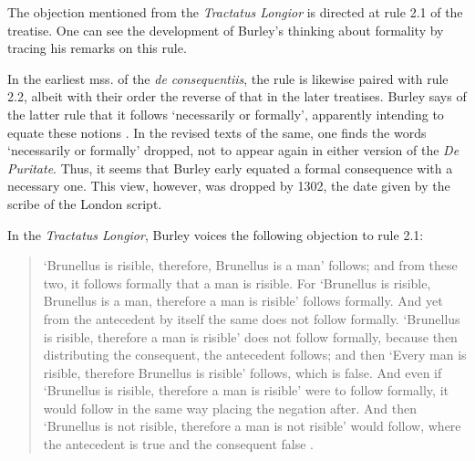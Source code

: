 \documentclass[]{article}
\begin{document}
The objection mentioned from the \textit{Tractatus Longior} is directed at rule 2.1 of the treatise. One can see the development of Burley's thinking about formality by tracing his remarks on this rule. 

In the earliest mss. of the \textit{de consequentiis}, the rule is likewise paired with rule 2.2, albeit with their order the reverse of that in the later treatises. Burley says of the latter rule that it follows `necessarily or formally', apparently intending to equate these notions \cite[p. 132, par. 84]{Green-Pedersen1980b}. In the revised texts of the same, one finds the words `necessarily or formally' dropped, not to appear again in either version of the \textit{De Puritate}. Thus, it seems that Burley early equated a formal consequence with a necessary one. This view, however, was dropped by 1302, the date given by the scribe of the London script.

In the \textit{Tractatus Longior}, Burley voices the following objection to rule 2.1: 
\begin{quote}
	`Brunellus is risible, therefore, Brunellus is a man' follows; and from these two, it follows formally that a man is risible. For `Brunellus is risible, Brunellus is a man, therefore a man is risible' follows formally. And yet from the antecedent by itself the same does not follow formally. `Brunellus is risible, therefore a man is risible' does not follow formally, because then distributing the consequent, the antecedent follows; and then `Every man is risible, therefore Brunellus is risible' follows, which is false. And even if `Brunellus is risible, therefore a man is risible' were to follow formally, it would follow in the same way placing the negation after. And then `Brunellus is not risible, therefore a man is not risible' would follow, where the antecedent is true and the consequent false \cite[p. 80.13-29]{BurleyDPAL}.
\end{quote}
\end{document}
